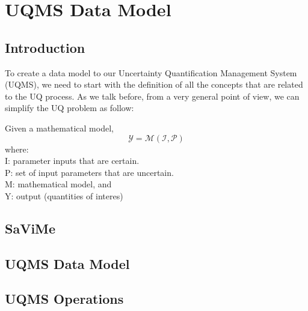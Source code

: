 \chapter{UQMS Data Model}\label{cap_data_model}

\section{Introduction}
To create a data model to our Uncertainty Quantification Management System (UQMS), we need to start with the definition of all the concepts that are related to the UQ process. As we talk before, from a very general point of view, we can simplify the UQ problem as follow:

Given a mathematical model, 
\begin{equation}
	\mathcal{Y}=\mathcal{M}(\mathcal{I}, \mathcal{P})
\end{equation}
where: \\
I: parameter inputs that are certain. \\
P: set of input parameters that are uncertain. \\
M: mathematical model, and \\
Y: output (quantities of interes)



\section{SaViMe}

\section{UQMS Data Model}

\section{UQMS Operations}
